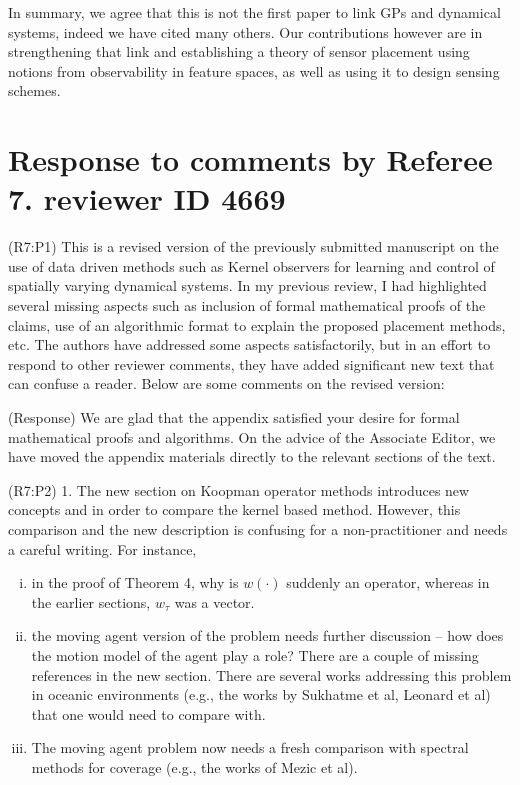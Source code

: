 \documentclass{letter}
\begin{document}
In summary, we agree that this is not the first paper to link GPs and dynamical systems, indeed we have cited many others. Our contributions however are in strengthening that link and establishing a theory of sensor placement using notions from observability in feature spaces, as well as using it to design sensing schemes.

\section{Response to comments by Referee 7. reviewer ID 4669}

{\color{red}(R7:P1)} This is a revised version of the previously submitted manuscript on the use of data driven methods such as Kernel observers for learning and control of spatially varying dynamical systems. In my previous review, I had highlighted several missing aspects such as inclusion of formal mathematical proofs of the claims, use of an algorithmic format to explain the proposed placement methods, etc. The authors have addressed some aspects satisfactorily, but in an effort to respond to other reviewer comments, they have added significant new text that can confuse a reader. Below are some comments on the revised version:

{\color{red}(Response)} We are glad that the appendix satisfied your desire for formal mathematical proofs and algorithms. On the advice of the Associate Editor, we have moved the appendix materials directly to the relevant sections of the text.

{\color{red}(R7:P2)} 1. The new section on Koopman operator methods introduces new concepts and in order to compare the kernel based method. However, this comparison and the new description is confusing for a non-practitioner and needs a careful writing. For instance,
\begin{enumerate}[(i)]
	\item in the proof of Theorem 4, why is $w(\cdot)$ suddenly an operator, whereas in the earlier sections, $w_{\tau}$ was a vector.
	\item the moving agent version of the problem needs further discussion -- how does the motion model of the agent play a role? There are a couple of missing references in the new section. There are several works	addressing this problem in oceanic environments (e.g., the works by	Sukhatme et al, Leonard et al) that one would need to compare with.
	\item The moving agent problem now needs a fresh comparison with spectral methods for coverage (e.g., the works of Mezic et al). 
\end{enumerate}
\end{document}

